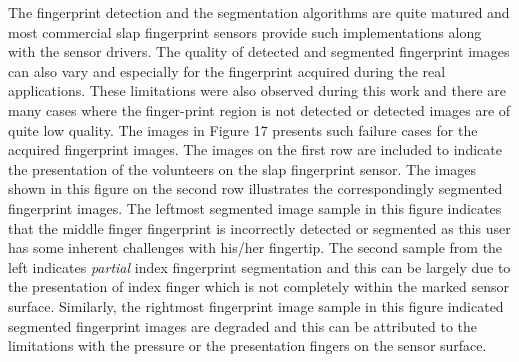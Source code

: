 The fingerprint detection and the segmentation algorithms are quite matured and most commercial slap fingerprint sensors provide such implementations along with the sensor drivers. The quality of detected and segmented fingerprint images can also vary and especially for the fingerprint acquired during the real applications. These limitations were also observed during this work and there are many cases where the finger-print region is not detected or detected images are of quite low quality. The images in Figure 17 presents such failure cases for the acquired fingerprint images. The images on the first row are included to indicate the presentation of the volunteers on the slap fingerprint sensor.  The images shown in this figure on the second row illustrates the correspondingly segmented fingerprint images. The leftmost segmented image sample in this figure indicates that the middle finger fingerprint is incorrectly detected or segmented as this user has some inherent challenges with his/her fingertip. The second sample from the left indicates \textit{partial} index fingerprint segmentation and this can be largely due to the presentation of index finger which is not completely within the marked sensor surface.  Similarly, the rightmost fingerprint image sample in this figure indicated segmented fingerprint images are degraded and this can be attributed to the limitations with the pressure or the presentation fingers on the sensor surface. 